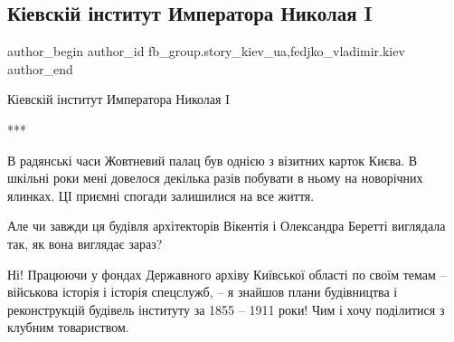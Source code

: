  
 
 
 
 
 
\subsection{Кіевскій інститут Императора Николая I}
\label{sec:17_12_2021.fb.fb_group.story_kiev_ua.1.kiev_oktjabrskij_dvorec}
 
\ifcmt
 author_begin
   author_id fb_group.story_kiev_ua,fedjko_vladimir.kiev
 author_end
\fi

Кіевскій інститут Императора Николая I

***

В радянські часи Жовтневий палац був однією з візитних карток Києва. В шкільні
роки мені довелося декілька разів побувати в ньому на новорічних ялинках. ЦІ
приємні спогади залишилися на все життя.

Але чи завжди ця будівля архітекторів Вікентія і Олександра Беретті виглядала
так, як вона виглядає зараз? 

Ні! Працюючи у фондах Державного архіву Київської області по своїм темам –
військова історія і історія спецслужб, – я знайшов плани будівництва і
реконструкцій будівель інституту за 1855 – 1911 роки! Чим і хочу поділитися з
клубним товариством.

\begin{multicols}{2} %
\setlength{\parindent}{0pt}





\end{multicols} %

